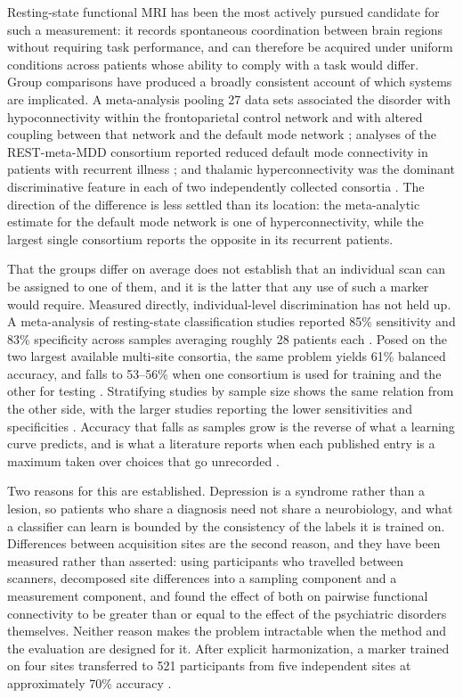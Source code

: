 Resting-state functional MRI has been the most actively pursued candidate for such a measurement:
it records spontaneous coordination between brain regions without requiring task performance, and
can therefore be acquired under uniform conditions across patients whose ability to comply with a
task would differ. Group comparisons have produced a broadly consistent account of which systems
are implicated. A meta-analysis pooling 27 data sets associated the disorder with hypoconnectivity
within the frontoparietal control network and with altered coupling between that network and the
default mode network \citep{kaiser2015}; analyses of the REST-meta-MDD consortium reported reduced
default mode connectivity in patients with recurrent illness \citep{yan2019pnas}; and thalamic
hyperconnectivity was the dominant discriminative feature in each of two independently collected
consortia \citep{gallo2023}. The direction of the difference is less settled than its location: the
meta-analytic estimate for the default mode network is one of hyperconnectivity, while the largest
single consortium reports the opposite in its recurrent patients.

That the groups differ on average does not establish that an individual scan can be assigned to one
of them, and it is the latter that any use of such a marker would require. Measured directly,
individual-level discrimination has not held up. A meta-analysis of resting-state classification
studies reported 85\% sensitivity and 83\% specificity across samples averaging roughly 28 patients
each \citep{kambeitz2017}. Posed on the two largest available multi-site consortia, the same problem
yields 61\% balanced accuracy, and falls to 53--56\% when one consortium is used for training and
the other for testing \citep{gallo2023}. Stratifying studies by sample size shows the same relation
from the other side, with the larger studies reporting the lower sensitivities and specificities
\citep{chen2023meta}. Accuracy that falls as samples grow is the reverse of what a learning curve
predicts, and is what a literature reports when each published entry is a maximum taken over choices
that go unrecorded \citep{schnack2016, marek2022}.

Two reasons for this are established. Depression is a syndrome rather than a lesion, so patients who
share a diagnosis need not share a neurobiology, and what a classifier can learn is bounded by the
consistency of the labels it is trained on. Differences between acquisition sites are the second
reason, and they have been measured rather than asserted: using participants who travelled between
scanners, \citet{yamashita2019} decomposed site differences into a sampling component and a
measurement component, and found the effect of both on pairwise functional connectivity to be
greater than or equal to the effect of the psychiatric disorders themselves. Neither reason makes
the problem intractable when the method and the evaluation are designed for it. After explicit
harmonization, a marker trained on four sites transferred to 521 participants from five independent
sites at approximately 70\% accuracy \citep{yamashita2020}.

